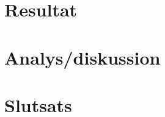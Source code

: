 \documentclass[12pt, a4paper]{report}
\begin{document}
 


\section{Resultat}

\section{Analys/diskussion}



\section{Slutsats}


\printbibliography
\end{document}
